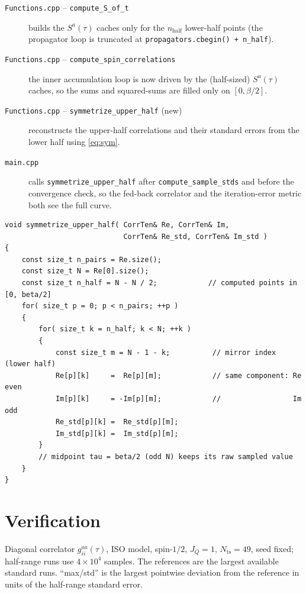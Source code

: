 \documentclass[11pt]{article}
\newcommand{\g}{g}
\newcommand{\bt}{\beta}
\begin{document}
\begin{description}
  \item[\texttt{Functions.cpp} -- \texttt{compute\_S\_of\_t}] builds the $S^a(\tau)$
        caches only for the $n_{\mathrm{half}}$ lower-half points (the propagator loop
        is truncated at \texttt{propagators.cbegin() + n\_half}).
  \item[\texttt{Functions.cpp} -- \texttt{compute\_spin\_correlations}] the inner
        accumulation loop is now driven by the (half-sized) $S^a(\tau)$ caches, so the
        sums and squared-sums are filled only on $[0,\bt/2]$.
  \item[\texttt{Functions.cpp} -- \texttt{symmetrize\_upper\_half} (new)]
        reconstructs the upper-half correlations and their standard errors from the
        lower half using \eqref{eq:sym}.
  \item[\texttt{main.cpp}] calls \texttt{symmetrize\_upper\_half} after
        \texttt{compute\_sample\_stds} and before the convergence check, so the
        fed-back correlator and the iteration-error metric both see the full curve.
\end{description}

\begin{lstlisting}[caption={Reconstruction kernel (Functions.cpp).}]
void symmetrize_upper_half( CorrTen& Re, CorrTen& Im,
                            CorrTen& Re_std, CorrTen& Im_std )
{
    const size_t n_pairs = Re.size();
    const size_t N = Re[0].size();
    const size_t n_half = N - N / 2;            // computed points in [0, beta/2]
    for( size_t p = 0; p < n_pairs; ++p )
    {
        for( size_t k = n_half; k < N; ++k )
        {
            const size_t m = N - 1 - k;          // mirror index (lower half)
            Re[p][k]     =  Re[p][m];            // same component: Re even
            Im[p][k]     = -Im[p][m];            //                 Im odd
            Re_std[p][k] =  Re_std[p][m];
            Im_std[p][k] =  Im_std[p][m];
        }
        // midpoint tau = beta/2 (odd N) keeps its raw sampled value
    }
}
\end{lstlisting}

\section{Verification}

Diagonal correlator $\g^{aa}_{ii}(\tau)$, ISO model, spin-$1/2$, $J_Q=1$,
$N_{\mathrm{ts}}=49$, seed fixed; half-range runs use $4\times10^4$ samples. The
references are the largest available standard runs. ``max/std'' is the largest
pointwise deviation from the reference in units of the half-range standard error.
\end{document}
